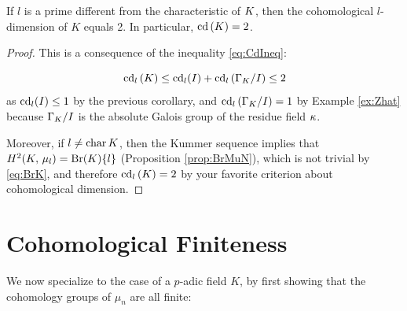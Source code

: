 \documentclass[a4paper, oneside]{memoir}
\begin{document}
\begin{theorem}\label{thm:CohomFin}
    If $l$ is a prime different from the characteristic of $K$, then the cohomological $l$-dimension of $K$ equals 2. In particular, $\operatorname{cd}{(K)}=2$.
\end{theorem}

\begin{proof}
    This is a consequence of the inequality \ref{eq:CdIneq}:

    \[
        \operatorname{cd}_l{(K)}\leq \operatorname{cd}_l(I)+\operatorname{cd}_l{(\Gamma_K / I)} \leq 2
    \]
    as $\operatorname{cd}_l(I)\leq 1$ by the previous corollary, and $\operatorname{cd}_l{(\Gamma_K / I)} = 1$ by Example \ref{ex:Zhat} because $\Gamma_K / I$ is the absolute Galois group of the residue
    field $\kappa$.

    Moreover, if $l\neq \operatorname{char}{K}$, then the Kummer sequence implies that $H^{2}( K, \, \mu_l )=\mathrm{Br}(K)\{l\}$ (Proposition \ref{prop:BrMuN}), which is not trivial by \eqref{eq:BrK}, and
    therefore $\operatorname{cd}_l{(K)}=2$ by your favorite criterion about cohomological dimension.
\end{proof}

\section{Cohomological Finiteness}

We now specialize to the case of a $p$-adic field $K$, by first showing that the cohomology groups of $\mu_n$ are all finite:
\end{document}
